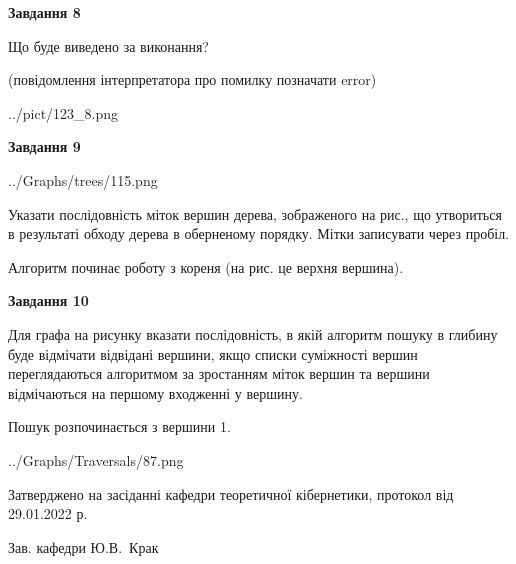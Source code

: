 \documentclass[12pt, ukrainian]{article}
\begin{document}
{\begin {large}
{\begin {center}\textbf{Завдання 8}\end {center}}\par
Що буде виведено за виконання?\par
 (повідомлення інтерпретатора про помилку позначати error)\par
\begin{center}
	{../pict/123_8.png}
\end{center}
\newpage

{\begin {center}\textbf{Завдання 9}\end {center}}\par

\begin{center}
	{../Graphs/trees/115.png}
\end{center}
Указати послідовність міток вершин дерева, зображеного на рис., що утвориться в результаті обходу дерева в оберненому порядку. Мітки записувати через пробіл.\par Алгоритм починає роботу з кореня (на рис. це верхня вершина).\par
\newpage

{\begin {center}\textbf{Завдання 10}\end {center}}\par
Для графа на рисунку вказати послідовність, в якій алгоритм пошуку в глибину буде відмічати відвідані вершини, якщо списки суміжності вершин переглядаються алгоритмом за зростанням міток вершин та вершини відмічаються на першому вход\-женні у вершину.\par
Пошук розпочинається з вершини 1.\par

\begin{center}
	{../Graphs/Traversals/87.png}
\end{center}\par
\newpage


\end {large}
}
{\smallskip \begin {small} Затверджено на засіданні кафедри теоретичної кібернетики, протокол  від   29.01.2022 р.\par\smallskip\smallskip
{\parbox {6.5 cm}{Зав. кафедри \dotfill Ю.В.~Крак}} \end{small}}
\end{document}
